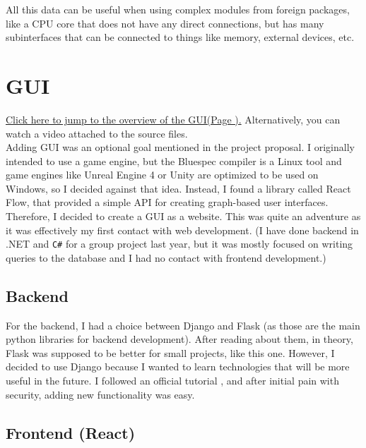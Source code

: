 \documentclass[12pt]{report}
\begin{document}
All this data can be useful when using complex modules from foreign packages, like a CPU core that does not have any direct connections, but has many subinterfaces that can be connected to things like memory, external devices, etc.

\section{GUI}
\hyperref[fig:Overview]{Click here to jump to the overview of the GUI(Page \pageref{fig:Overview}).} Alternatively, you can watch a video attached to the source files.
\\
Adding GUI was an optional goal mentioned in the project proposal. I originally intended to use a game engine, but the Bluespec compiler is a Linux tool and game engines like Unreal Engine 4 or Unity are optimized to be used on Windows, so I decided against that idea. Instead, I found a library called React Flow, that provided a simple API for creating graph-based user interfaces. Therefore, I decided to create a GUI as a website. This was quite an adventure as it was effectively my first contact with web development. (I have done backend in .NET and \verb!C#! for a group project last year, but it was mostly focused on writing queries to the database and I had no contact with frontend development.)

\subsection{Backend}
For the backend, I had a choice between Django and Flask (as those are the main python libraries for backend development). After reading about them, in theory, Flask was supposed to be better for small projects, like this one. However, I decided to use Django because I wanted to learn technologies that will be more useful in the future. I followed an official tutorial \href{https://docs.djangoproject.com/en/4.0/intro/tutorial01/}{}\cite{DjangoTut}, and after initial pain with security, adding new functionality was easy.

\subsection{Frontend (React)}
\end{document}
